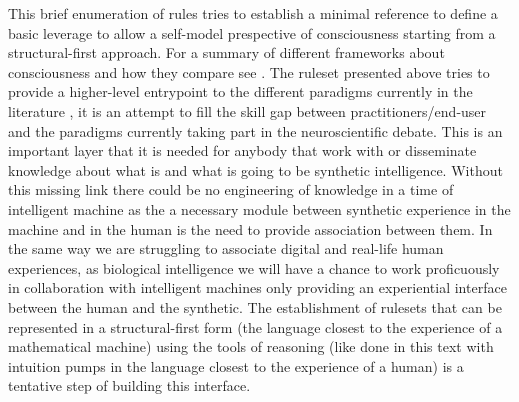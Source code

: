 \documentclass[14pt]{extarticle}
\begin{document}
This brief enumeration of rules tries to establish a minimal reference to define a basic leverage to allow a self-model prespective of consciousness starting from a structural-first approach. For a summary of different frameworks about consciousness and how they compare see \cite{SchuGraz/niac001}. The ruleset presented above tries to provide a higher-level entrypoint to the different paradigms currently in the literature \cite{SchuGraz/niac001}, it is an attempt to fill the skill gap between practitioners/end-user and the paradigms currently taking part in the neuroscientific debate. This is an important layer that it is needed for anybody that work with or disseminate knowledge about what is and what is going to be synthetic intelligence. Without this missing link there could be no engineering of knowledge in a time of intelligent machine as the a necessary module between synthetic experience in the machine and in the human is the need to provide association between them. In the same way we are struggling to associate digital and real-life human experiences, as biological intelligence we will have a chance to work proficuously in collaboration with intelligent machines only providing an experiential interface between the human and the synthetic. The establishment of rulesets that can be represented in a structural-first form (the language closest to the experience of a mathematical machine) using the tools of reasoning (like done in this text with intuition pumps in the language closest to the experience of a human) is a tentative step of building this interface.   
\end{document}

